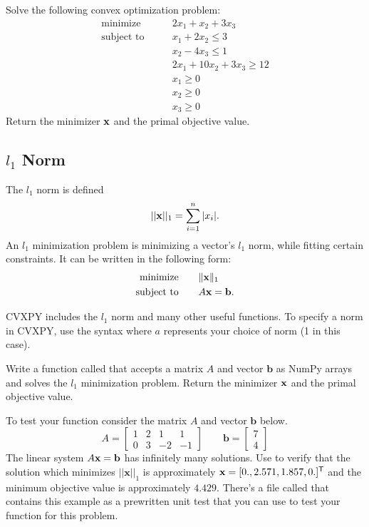 \begin{problem}
Solve the following convex optimization problem:
\begin{align*}
\text{minimize}\qquad &2x_1+x_2+3x_3 \\
\text{subject to}\qquad &x_1+2x_2 \leq 3 \\
		&x_2-4x_3\leq 1\\
	        &2x_1+10x_2+3x_3 \geq 12 \\
		&x_1 \geq 0 \\
		&x_2 \geq 0 \\
		&x_3 \geq 0
\end{align*}
Return the minimizer $\mathbf{x}$ and the primal objective value.
\end{problem}
\subsection*{$l_1$ Norm}
The $l_1$ norm is defined 
\[||\mathbf{x}||_1=\sum_{i=1}^n |x_i|.\]
An $l_1$ minimization problem is minimizing a vector's $l_1$ norm, while fitting certain constraints. It can be written in the following form:
\begin{align*}
\text{minimize}\qquad &\|\mathbf{x}\|_1\\
\text{subject to} \qquad &A\mathbf{x} = \mathbf{b}.
\end{align*}

CVXPY includes the $l_1$ norm and many other useful functions.
To specify a norm in CVXPY, use the syntax  where $a$ represents your choice of norm (1 in this case).

\begin{problem}
Write a function called  that accepts a matrix $A$ and vector $\mathbf{b}$ as NumPy arrays and solves the $l_1$ minimization problem.
Return the minimizer $\mathbf{x}$ and the primal objective value.

To test your function consider the matrix $A$ and vector $\mathbf{b}$ below.
\[
A = \begin{bmatrix}
1 & 2 & 1 & 1\\
0 & 3 & -2 & -1
\end{bmatrix} \qquad
\mathbf{b} = \begin{bmatrix}
7 \\
4
\end{bmatrix}
\]
The linear system $A\mathbf{x} = \mathbf{b}$ has infinitely many solutions.
Use  to verify that the solution which minimizes $||\mathbf{x}||_1$ is approximately $\mathbf{x} = [0., 2.571, 1.857, 0.]^{\mathsf T} $ and the minimum objective value is approximately $4.429$.
There's a file called  that contains this example as a prewritten unit test that you can use to test your function for this problem.
\label{prob:l1}
\end{problem}

